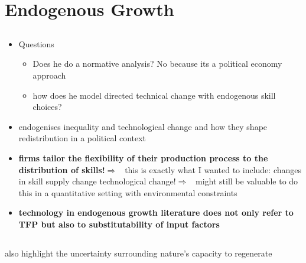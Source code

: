 \documentclass[12pt]{article}
\newcommand{\ar}{$\Rightarrow$ \ }
\begin{document}
\section{Endogenous Growth}
\hypertarget{endgro}{}
\localtableofcontents

\subsection{\cite{Benabou2005InequalityContract}}
\begin{itemize}
	\item Questions
	\begin{itemize}
	\item Does he do a normative analysis? No because its a political economy approach
	\item how does he model directed technical change with endogenous skill choices?
	\end{itemize}
	\item endogenises inequality and technological change and how they shape redistribution in a political context
	\item \textbf{firms tailor the flexibility of their production process to the distribution of skills!}\ar this is exactly what I wanted to include: changes in skill supply change technological change!\ar might still be valuable to do this in a quantitative setting with environmental constraints
	\item \textbf{technology in endogenous growth literature does not only refer to TFP but also to substitutability of input factors}
\end{itemize}
\subsection{\cite{Acemoglu2012TheChange}} also highlight the uncertainty surrounding nature's capacity to regenerate
\end{document}
